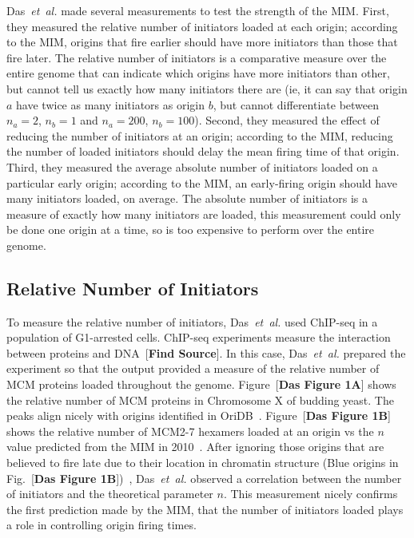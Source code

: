 {	Das~\emph{et~al.} made several measurements to test the strength of the MIM.
	First, they measured the relative number of initiators loaded at each origin; according to the MIM, origins that fire earlier should have more initiators than those that fire later.
	The relative number of initiators is a comparative measure over the entire genome that can indicate which origins have more initiators than other, but cannot tell us exactly how many initiators there are (ie, it can say that origin $a$ have twice as many initiators as origin $b$, but cannot differentiate between $n_a=2$, $n_b=1$ and $n_a=200$, $n_b=100$).
	Second, they measured the effect of reducing the number of initiators at an origin; according to the MIM, reducing the number of loaded initiators should delay the mean firing time of that origin.
	Third, they measured the average absolute number of initiators loaded on a particular early origin; according to the MIM, an early-firing origin should have many initiators loaded, on average.
	The absolute number of initiators is a measure of exactly how many initiators are loaded, this measurement could only be done one origin at a time, so is too expensive to perform over the entire genome.
	
		\subsection{Relative Number of Initiators}
		\label{subsec:RelativeNo}
		
		To measure the relative number of initiators, Das~\emph{et~al.} used ChIP-seq in a population of G1-arrested cells.
		ChIP-seq experiments measure the interaction between proteins and DNA~[\textbf{Find Source}].
		In this case, Das~\emph{et~al.} prepared the experiment so that the output provided a measure of the relative number of MCM proteins loaded throughout the genome.
		Figure~[\textbf{Das Figure 1A}] shows the relative number of MCM proteins in Chromosome X of budding yeast.
		The peaks align nicely with origins identified in OriDB~\cite{OriDB}.
		Figure~[\textbf{Das Figure 1B}] shows the relative number of MCM2-7 hexamers loaded at an origin vs the $n$ value predicted from the MIM in 2010~\cite{ScottsPaper}.
		After ignoring those origins that are believed to fire late due to their location in chromatin structure (Blue origins in Fig.~[\textbf{Das Figure 1B}])~\cite{Chromatin}, Das~\emph{et~al.} observed a correlation between the number of initiators and the theoretical parameter $n$.
		This measurement nicely confirms the first prediction made by the MIM, that the number of initiators loaded plays a role in controlling origin firing times.
		
}
